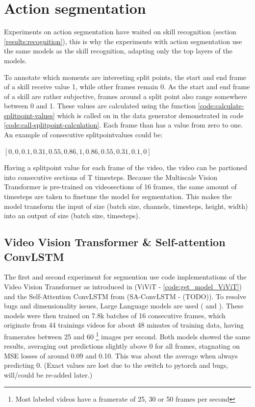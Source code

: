 \section{Action segmentation}

Experiments on action segmentation have waited on skill recognition (section \ref{results:recognition}), this is why the experiments with action segmentation use the same models as the skill recognition, adapting only the top layers of the models.

To annotate which moments are interesting split points, the start and end frame of a skill receive value 1, while other frames remain 0.
As the start and end frame of a skill are rather subjective, frames around a split point also range somewhere between 0 and 1. These values are calculated using the function \ref{code:calculate-splitpoint-values} which is called on in the data generator demonstrated in code \ref{code:call-splitpoint-calculation}.
Each frame than has a value from zero to one. An example of consecutive splitpointvalues could be:

\([0, 0, 0.1, 0.31, 0.55, 0.86, 1, 0.86, 0.55, 0.31, 0.1, 0]\)

Having a splitpoint value for each frame of the video, the video can be partioned into consecutive sections of T timesteps. Because the Multiscale Vision Transformer is pre-trained on videosections of 16 frames, the same amount of timesteps are taken to finetune the model for segmentation. This makes the model transform the input of size (batch size, channels, timesteps, height, width) into an output of size (batch size, timesteps).

\subsection{Video Vision Transformer \& Self-attention ConvLSTM}
\label{subsec:video-models-from-scratch}

The first and second experiment for segmention use code implementations of the Video Vision Transformer as introduced in \textcite{Arnab2021} (ViViT - \ref{code:get_model_ViViT}) and the Self-Attention ConvLSTM from \textcite{Lin_2020} (SA-ConvLSTM - (TODO)).
To resolve bugs and dimensionality issues, Large Language models are used (\autocite{OpenAI_ChatGPT_2025} and \autocite{Deepseek_2025}).
These models were then trained on 7.8k batches of 16 consecutive frames, which originate from 44 trainings videos for about 48 minutes of training data, having framerates between 25 and 60 \footnote{Most labeled videos have a framerate of 25, 30 or 50 frames per second} images per second.
Both models showed the same results, averaging out predictions slightly above 0 for all frames, stagnating on MSE losses of around 0.09 and 0.10. This was about the average when always predicting 0. (Exact values are lost due to the switch to pytorch and bugs, will/could be re-added later.)

